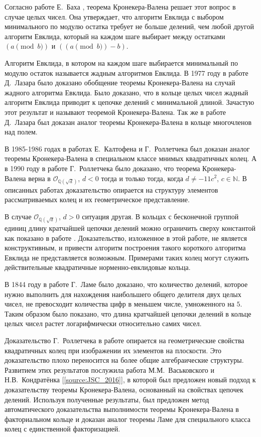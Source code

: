 \documentclass[_00_dissertation.tex]{subfiles}
\begin{document}
Согласно работе Е.~Баха \cite{source:Bach_Algorithmic_number_theory}, теорема Кронекера-Валена решает этот вопрос в случае целых чисел.
Она утверждает, что алгоритм Евклида с выбором минимального по модулю остатка требует не больше делений, чем любой другой алгоритм Евклида, который на каждом шаге выбирает между остатками $(a\pmod{b})$ и $((a\pmod{b})-b)$.

Алгоритм Евклида, в котором на каждом шаге выбирается минимальный по модулю остаток называется жадным алгоритмов Евклида.
В 1977 году в работе Д.~Лазара \cite{source:Lazard} было доказано обобщение теоремы Кронекера-Валена на случай жадного алгоритма Евклида.
Было доказано, что в кольце целых чисел жадный алгоритм Евклида приводит к цепочке делений с минимальной длиной.
Зачастую этот результат и называют теоремой Кронекера-Валена.
Так же в работе Д.~Лазара был доказан аналог теоремы Кронекера-Валена в кольце многочленов над полем.

В 1985-1986 годах в работах Е.~Калтофена и Г.~Роллетчека \cite{source:Kaltofen, source:Rolletschek_1986} был доказан аналог теоремы Кронекера-Валена в специальном классе мнимых квадратичных колец.
А в 1990 году в работе Г.~Роллетчека \cite{source:Rolletschek_1990} было доказано, что теорема Кронекера-Валена верна в $\mathcal{O}_{\mathbb{Q}(\sqrt{d})}$, $d < 0$ тогда и только тогда, когда $d \neq -11c^{2}$, $c \in \mathbb{N}$.
В описанных работах доказательство опирается на структуру элементов рассматриваемых колец и их геометрическое представление.

В случае $\mathcal{O}_{\mathbb{Q}(\sqrt{d})}$, $d > 0$ ситуация другая.
В кольцах с бесконечной группой единиц длину кратчайшей цепочки делений можно ограничить сверху константой как показано в работе \cite{source:Cooke}.
Доказательство, изложенное в этой работе, не является конструктивным, и привести алгоритм построения такого короткого алгоритма Евклида не представляется возможным.
Примерами таких колец могут служить действительные квадратичные норменно-евклидовые кольца.

В 1844 году в работе Г.~Ламе было доказано, что количество делений, которое нужно выполнить для нахождения наибольшего общего делителя двух целых чисел, не превосходит количества цифр в меньшем числе, умноженного на $5$.
Таким образом было показано, что длина кратчайшей цепочки делений в кольце целых чисел растет логарифмически относительно самих чисел.

Доказательство Г.~Роллетчека в работе \cite{source:Rolletschek_1990} опирается на геометрические свойства квадратичных колец при изображении их элементов на плоскости.
Это доказательство плохо переносится на более общие алгебраические структуры.
Развитием этих результатов послужила работа М.М.~Васьковского и Н.В.~Кондратёнка [\ref{source:JSC_2016}], в которой был предложен новый подход к доказательству теоремы Кронекера-Валена, основанный на свойствах цепочек делений.
Используя полученные результаты, был предложен метод автоматического доказательства выполнимости теоремы Кронекера-Валена в факториальном кольце и доказан аналог теоремы Ламе для специального класса колец с единственной факторизацией.
\end{document}
